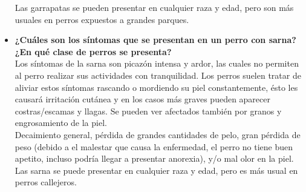 \documentclass[a4paper,table,xcdraw]{article}
\begin{document}
\begin{itemize}
    Las garrapatas se pueden presentar en cualquier raza y edad, pero son más usuales en perros expuestos a grandes parques.
    \item \textbf{¿Cuáles son los síntomas que se presentan en un perro con sarna? ¿En qué clase de perros se presenta?}\\
    Los síntomas de la sarna son picazón intensa y ardor, las cuales no permiten al perro realizar sus actividades con tranquilidad. 
    Los perros suelen tratar de aliviar estos síntomas rascando o mordiendo su piel constantemente, ésto les causará irritación cutánea y en los casos más graves pueden aparecer costras/escamas y llagas.
    Se pueden ver afectados también por granos y engrosamiento de la piel.\\
    Decaimiento general, pérdida de grandes cantidades de pelo, gran pérdida de peso (debido a el malestar que causa la enfermedad, el perro no tiene buen apetito, incluso podría llegar a presentar anorexia), y/o mal olor en la piel.\\
    Las sarna se puede presentar en cualquier raza y edad, pero es más usual en perros callejeros.


\end{itemize}
\end{document}
